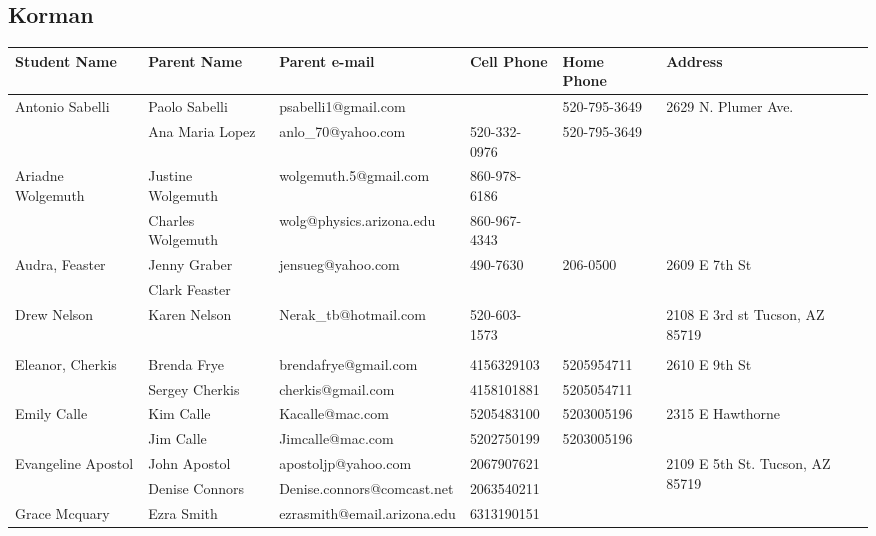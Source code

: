 \documentclass[landscape]{article}\usepackage[]{graphicx}\usepackage[]{color}
\begin{document}
\subsection{Korman}
\begin{longtable}{|p{100pt}|p{100pt}|p{140pt}|p{60pt}|p{64pt}|p{120pt}|}
\textbf{Student Name} & \textbf{Parent Name} & \textbf{Parent e-mail} & \textbf{Cell Phone} & \textbf{Home Phone} & \textbf{Address}\\
\hline
\hline
\multirow{2}{100pt}{Antonio Sabelli} & Paolo Sabelli & psabelli1@gmail.com &  & 520-795-3649 & \multirow{2}{120pt}{2629 N. Plumer Ave.} \\
 & Ana Maria Lopez & anlo\_70@yahoo.com & 520-332-0976 & 520-795-3649 & \\
\hline
\multirow{2}{100pt}{Ariadne Wolgemuth} & Justine Wolgemuth & wolgemuth.5@gmail.com & 860-978-6186 &  & \multirow{2}{120pt}{} \\
 & Charles Wolgemuth & wolg@physics.arizona.edu & 860-967-4343 &  & \\
\hline
\multirow{2}{100pt}{Audra, Feaster} & Jenny Graber & jensueg@yahoo.com & 490-7630 & 206-0500 & \multirow{2}{120pt}{2609 E 7th St} \\
 & Clark Feaster &  &  &  & \\
\hline
\multirow{2}{100pt}{Drew Nelson} & Karen Nelson & Nerak\_tb@hotmail.com & 520-603-1573 &  & \multirow{2}{120pt}{2108 E 3rd st Tucson, AZ 85719} \\
 &  &  &  &  & \\
\hline
\multirow{2}{100pt}{Eleanor, Cherkis} & Brenda Frye & brendafrye@gmail.com & 4156329103 & 5205954711 & \multirow{2}{120pt}{2610 E 9th St} \\
 & Sergey Cherkis & cherkis@gmail.com & 4158101881 & 5205054711 & \\
\hline
\multirow{2}{100pt}{Emily Calle} & Kim Calle & Kacalle@mac.com & 5205483100 & 5203005196 & \multirow{2}{120pt}{2315 E Hawthorne} \\
 & Jim Calle & Jimcalle@mac.com & 5202750199 & 5203005196 & \\
\hline
\multirow{2}{100pt}{Evangeline Apostol} & John Apostol & apostoljp@yahoo.com & 2067907621 &  & \multirow{2}{120pt}{2109 E 5th St. Tucson, AZ 85719} \\
 & Denise Connors & Denise.connors@comcast.net & 2063540211 &  & \\
\hline
\multirow{2}{100pt}{Grace Mcquary} & Ezra Smith & ezrasmith@email.arizona.edu & 6313190151 &  & \multirow{2}{120pt}{} \\

\end{longtable}
\end{document}
